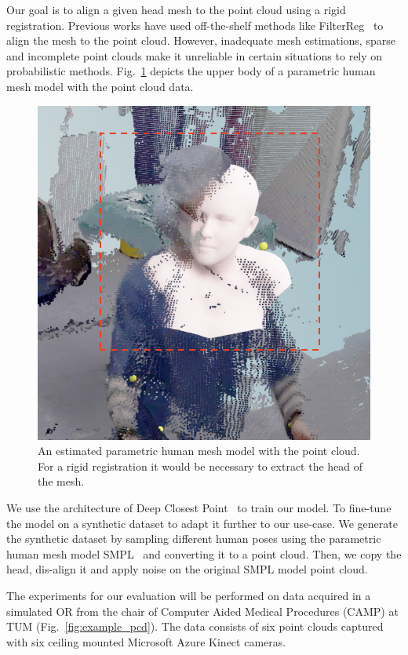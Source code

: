 \documentclass[a4paper,pagesize 10pt]{scrartcl}
\begin{document}
Our goal is to align a given head mesh to the point cloud using a rigid registration. 
Previous works have used off-the-shelf methods like FilterReg~\cite{filterreg} to align the mesh to the point cloud. 
However, inadequate mesh estimations, sparse and incomplete point clouds make it unreliable in certain situations to rely on probabilistic methods.
Fig.~\ref{fig:example_mesh} depicts the upper body of a parametric human mesh model with the point cloud data.

\begin{figure}[!ht]
    \centering
    \includegraphics[width=0.95\columnwidth]{figures/issue_pointcloud.png}
    \caption{An estimated parametric human mesh model with the point cloud. For a rigid registration it would be necessary to extract the head of the mesh.}
    \label{fig:example_mesh}
\end{figure}

We use the architecture of Deep Closest Point~\cite{dcp} to train our model.
To fine-tune the model on a synthetic dataset to adapt it further to our use-case.
We generate the synthetic dataset by sampling different human poses using the parametric human mesh model SMPL~\cite{SMPL:2015} and converting it to a point cloud.
Then, we copy the head, dis-align it and apply noise on the original SMPL model point cloud.

The experiments for our evaluation will be performed on data acquired in a simulated OR from the chair of Computer Aided Medical Procedures (CAMP) at TUM (Fig.~\ref{fig:example_pcd}).
The data consists of six point clouds captured with six ceiling mounted Microsoft Azure Kinect cameras.
\end{document}
